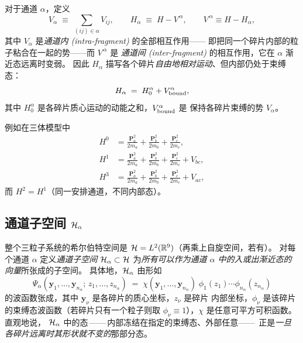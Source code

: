 对于通道 $\alpha$，定义
\begin{equation}
  V_\alpha \;\equiv\; \sum_{(ij)\in\alpha} V_{ij} ,
  \qquad
  H_\alpha \;\equiv\; H - V^{\,\alpha}, \qquad V^{\,\alpha}\equiv H-H_\alpha,
  \label{eq:multich-Halpha}
\end{equation}
其中 $V_\alpha$ 是\emph{通道内 (intra-fragment)} 的全部相互作用——
即把同一个碎片内部的粒子粘合在一起的势——而 $V^{\,\alpha}$ 是
\emph{通道间 (inter-fragment)} 的相互作用，它在 $\alpha$ 渐近态远离时变弱。
因此 $H_\alpha$ 描写各个碎片\emph{自由地相对运动}、但内部仍处于束缚态：
\begin{equation}
  H_\alpha \;=\; H_0^{\alpha} + V_{\rm bound}^{\alpha},
\end{equation}
其中 $H_0^\alpha$ 是各碎片质心运动的动能之和，$V_{\rm bound}^\alpha$ 是
保持各碎片束缚的势 $V_\alpha$。

例如在三体模型中
\begin{align}
  H^0 &= \tfrac{\mathbf{P}_a^2}{2m_a}+\tfrac{\mathbf{P}_b^2}{2m_b}+\tfrac{\mathbf{P}_c^2}{2m_c} ,\\
  H^1 &= \tfrac{\mathbf{P}_a^2}{2m_a}+\tfrac{\mathbf{P}_b^2}{2m_b}+\tfrac{\mathbf{P}_c^2}{2m_c}+V_{bc} ,\\
  H^3 &= \tfrac{\mathbf{P}_a^2}{2m_a}+\tfrac{\mathbf{P}_b^2}{2m_b}+\tfrac{\mathbf{P}_c^2}{2m_c}+V_{ac} ,
\end{align}
而 $H^2=H^1$（同一安排通道，不同内部态）。

\subsection{通道子空间 \(\mathcal{H}_\alpha\)}

整个三粒子系统的希尔伯特空间是
$\mathcal{H}=L^2(\mathbb{R}^9)$（再乘上自旋空间，若有）。
对每个通道 $\alpha$ 定义\emph{通道子空间} $\mathcal{H}_\alpha\subset\mathcal{H}$
为\emph{所有可以作为通道 $\alpha$ 中的入或出渐近态的向量}所张成的子空间。
具体地，$\mathcal{H}_\alpha$ 由形如
\begin{equation}
  \Psi_\alpha(\mathbf{y}_1,\dots,\mathbf{y}_{n_\alpha};\,z_1,\dots,z_{n_\alpha})
  \;=\; \chi(\mathbf{y}_1,\dots,\mathbf{y}_{n_\alpha})\;
        \phi_1(z_1)\cdots\phi_{n_\alpha}(z_{n_\alpha})
  \label{eq:multich-channel-wavefn}
\end{equation}
的波函数张成，其中 $\mathbf{y}_\nu$ 是各碎片的质心坐标，$z_\nu$ 是碎片
内部坐标，$\phi_\nu$ 是该碎片的束缚态波函数（若碎片只有一个粒子则取
$\phi_\nu\equiv 1$），$\chi$ 是任意可平方可积函数。直观地说，
$\mathcal{H}_\alpha$ 中的态\,——\,内部冻结在指定的束缚态、外部任意——\,
正是\emph{一旦各碎片远离时其形状就不变的}那部分态。


